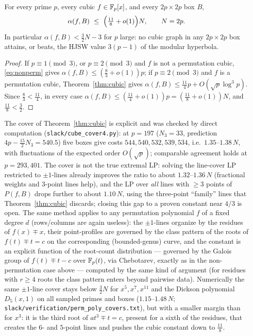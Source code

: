 \begin{corollary}\label{cor:cubic}
For every prime $p$, every cubic $f\in\mathbb{F}_p[x]$, and every $2p\times2p$ box $B$,
\[
\alpha(f,B)\ \le\ \Bigl(\tfrac{11}8+o(1)\Bigr)N,\qquad N=2p.
\]
In particular $\alpha(f,B)<\tfrac32N-3$ for $p$ large: no cubic graph in any $2p\times2p$ box attains, or beats, the
HJSW value $3(p-1)$ of the modular hyperbola.
\end{corollary}
\begin{proof}
If $p\equiv1\pmod3$, or $p\equiv2\pmod3$ and $f$ is not a permutation cubic, \eqref{eq:nonperm} gives
$\alpha(f,B)\le(\tfrac83+o(1))p$; if $p\equiv2\pmod3$ and $f$ is a permutation cubic, Theorem~\ref{thm:cubic} gives
$\alpha(f,B)\le\tfrac{11}4p+O(\sqrt p\log^3p)$. Since $\tfrac83<\tfrac{11}4$, in every case
$\alpha(f,B)\le(\tfrac{11}4+o(1))p=(\tfrac{11}8+o(1))N$, and $\tfrac{11}8<\tfrac32$.
\end{proof}

\begin{remark}
The cover of Theorem~\ref{thm:cubic} is explicit and was checked by direct computation
(\texttt{slack/cube\_cover4.py}): at $p=197$ ($N_3=33$, prediction $4p-\tfrac{15}2N_3=540.5$) five boxes give costs
$544,540,532,539,534$, i.e.\ $1.35$--$1.38\,N$, with fluctuations of the expected order $O(\sqrt p)$; comparable
agreement holds at $p=293,401$. The cover is not the true extremal LP: solving the line-cover LP restricted to
$\pm1$-lines already improves the ratio to about $1.32$--$1.36\,N$ (fractional weights and $3$-point lines help),
and the LP over \emph{all} lines with $\ge3$ points of $P(f,B)$ drops further to about $1.10\,N$, using the
three-point ``family'' lines that Theorem~\ref{thm:cubic} discards; closing this gap to a proven constant near
$4/3$ is open. The same method applies to any permutation polynomial $f$ of a fixed degree $d$ (rows/columns are
again useless): the $\pm1$-lines organize by the residues of $f(x)\mp x$, their point-profiles are governed by the
class pattern of the roots of $f(t)\mp t=c$ on the corresponding (bounded-genus) curve, and the constant is an
explicit function of the root-count distribution — governed by the Galois group of $f(t)\mp t-c$ over $\mathbb{F}_p(t)$, via
Chebotarev, exactly as in the non-permutation case above — computed by the same kind of argument (for residues with $r\ge4$ roots the class pattern enters beyond
pairwise data). Numerically the same $\pm1$-line cover stays below $\tfrac32N$ for $x^5,x^7,x^{11}$ and the Dickson
polynomial $D_5(x,1)$ on all sampled primes and boxes ($1.15$--$1.48\,N$; \texttt{slack/verification/perm\_poly\_covers.txt}),
but with a smaller margin than for $x^3$: it is the third root of $at^3\mp t=c$, present for a sixth of the residues, that
creates the $6$- and $5$-point lines and pushes the cubic constant down to $\tfrac{11}8$.
\end{remark}
